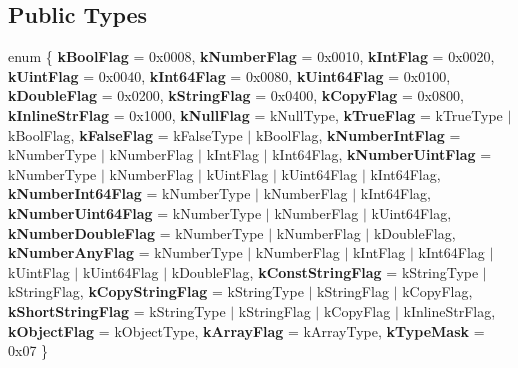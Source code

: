 \subsection*{Public Types}
\begin{DoxyCompactItemize}
\item 
\mbox{\label{a01992_aa3e89750b19e13a7374c3c0b86b8a113}} 
enum \{ \newline
{\bfseries k\+Bool\+Flag} = 0x0008, 
{\bfseries k\+Number\+Flag} = 0x0010, 
{\bfseries k\+Int\+Flag} = 0x0020, 
{\bfseries k\+Uint\+Flag} = 0x0040, 
\newline
{\bfseries k\+Int64\+Flag} = 0x0080, 
{\bfseries k\+Uint64\+Flag} = 0x0100, 
{\bfseries k\+Double\+Flag} = 0x0200, 
{\bfseries k\+String\+Flag} = 0x0400, 
\newline
{\bfseries k\+Copy\+Flag} = 0x0800, 
{\bfseries k\+Inline\+Str\+Flag} = 0x1000, 
{\bfseries k\+Null\+Flag} = k\+Null\+Type, 
{\bfseries k\+True\+Flag} = k\+True\+Type $\vert$ k\+Bool\+Flag, 
\newline
{\bfseries k\+False\+Flag} = k\+False\+Type $\vert$ k\+Bool\+Flag, 
{\bfseries k\+Number\+Int\+Flag} = k\+Number\+Type $\vert$ k\+Number\+Flag $\vert$ k\+Int\+Flag $\vert$ k\+Int64\+Flag, 
{\bfseries k\+Number\+Uint\+Flag} = k\+Number\+Type $\vert$ k\+Number\+Flag $\vert$ k\+Uint\+Flag $\vert$ k\+Uint64\+Flag $\vert$ k\+Int64\+Flag, 
{\bfseries k\+Number\+Int64\+Flag} = k\+Number\+Type $\vert$ k\+Number\+Flag $\vert$ k\+Int64\+Flag, 
\newline
{\bfseries k\+Number\+Uint64\+Flag} = k\+Number\+Type $\vert$ k\+Number\+Flag $\vert$ k\+Uint64\+Flag, 
{\bfseries k\+Number\+Double\+Flag} = k\+Number\+Type $\vert$ k\+Number\+Flag $\vert$ k\+Double\+Flag, 
{\bfseries k\+Number\+Any\+Flag} = k\+Number\+Type $\vert$ k\+Number\+Flag $\vert$ k\+Int\+Flag $\vert$ k\+Int64\+Flag $\vert$ k\+Uint\+Flag $\vert$ k\+Uint64\+Flag $\vert$ k\+Double\+Flag, 
{\bfseries k\+Const\+String\+Flag} = k\+String\+Type $\vert$ k\+String\+Flag, 
\newline
{\bfseries k\+Copy\+String\+Flag} = k\+String\+Type $\vert$ k\+String\+Flag $\vert$ k\+Copy\+Flag, 
{\bfseries k\+Short\+String\+Flag} = k\+String\+Type $\vert$ k\+String\+Flag $\vert$ k\+Copy\+Flag $\vert$ k\+Inline\+Str\+Flag, 
{\bfseries k\+Object\+Flag} = k\+Object\+Type, 
{\bfseries k\+Array\+Flag} = k\+Array\+Type, 
\newline
{\bfseries k\+Type\+Mask} = 0x07
 \}
\item 
\mbox{\label{a01992_a7ccf27c44058b4c11c3efc6473afb886}} 

\end{DoxyCompactItemize}
